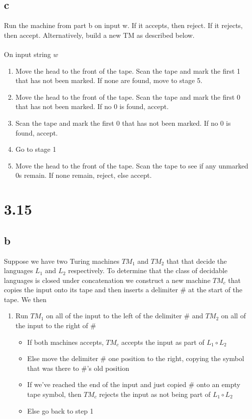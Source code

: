 \documentclass{article}
\begin{document}
\subsection*{c}
Run the machine from part b on input w. If it accepts, then reject. If it rejects, then accept. Alternatively, build a new TM as described below.\\\\
On input string $w$
\begin{enumerate}
    \item Move the head to the front of the tape. Scan the tape and mark the first 1 that has not been marked. If none are found, move to stage 5.
    \item Move the head to the front of the tape. Scan the tape and mark the first 0 that has not been marked. If no 0 is found, accept. 
    \item Scan the tape and mark the first 0 that has not been marked. If no 0 is found, accept.
    \item Go to stage 1
    \item Move the head to the front of the tape. Scan the tape to see if any unmarked 0s remain. If none remain, reject, else accept. 
\end{enumerate}

\section*{3.15}

\subsection*{b}
Suppose we have two Turing machines $TM_1$ and $TM_2$ that that decide the languages $L_1$ and $L_2$ respectively. To determine that the class of decidable languages is closed under concatenation we construct a new machine $TM_c$ that copies the input onto its tape and then inserts a delimiter $\#$ at the start of the tape. We then 
\begin{enumerate}
    \item Run $TM_1$ on all of the input to the left of the delimiter $\#$ and $TM_2$ on all of the input to the right of $\#$
    \begin{itemize}
        \item If both machines accepts, $TM_c$ accepts the input as part of $L_1 \circ L_2$
        \item Else move the delimiter $\#$ one position to the right, copying the symbol that was there to $\#$'s old position
        \item If we've reached the end of the input and just copied $\#$ onto an empty tape symbol, then $TM_c$ rejects the input as not being part of $L_1 \circ L_2$
        \item Else go back to step 1
    \end{itemize} 
\end{enumerate}
\end{document}
